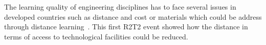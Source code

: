 \documentclass{intech-journal}
\begin{document}
The learning quality of engineering disciplines has to face several issues in developed countries such as distance and cost or materials which could be address through distance learning~\cite{winthrop2012new}. 
This first R2T2 event showed how the distance in terms of access to technological facilities could be reduced.


{}
\end{document}
